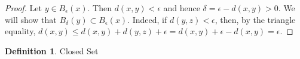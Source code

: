 \documentclass{article}
\theoremstyle{definition}
\newtheorem{definition}{Definition}[section]
\theoremstyle{remark}
\begin{document}
\begin{proof}

Let \( y \in B_{\epsilon}(x) \). Then \( d(x,y) < \epsilon \) and hence \( \delta = \epsilon -  d(x,y)  > 0\). We will show that \( B_{\delta}(y) \subset B_{\epsilon}(x)\). Indeed, if \( d(y,z) < \epsilon \), then, by the triangle equality, \( d(x,y)  \leq  d(x,y) + d(y,z) +  \epsilon = d(x,y) +  \epsilon - d(x,y) = \epsilon \). 

\end{proof}


\begin{definition} {Closed Set}


\end{definition}







\end{document}
